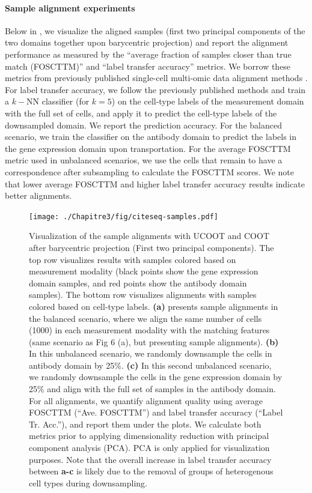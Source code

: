 \paragraph{Sample alignment experiments} Below in ,
we visualize the aligned samples (first two principal components of the two domains
together upon barycentric projection) and report the alignment performance as measured
by the ``average fraction of samples closer than true match (FOSCTTM)'' and
``label transfer accuracy'' metrics. We borrow these metrics from previously published
single-cell multi-omic data alignment methods \citep{Liu2019,cao2020unsupervised,Demetci22,Pamona,Demetci22-2}.
For label transfer accuracy, we follow the previously published methods
\citep{cao2020unsupervised, Pamona, Demetci22, Demetci22-2} and train a $k-$NN classifier
(for $k=5$) on the cell-type labels of the measurement domain with the full set of cells,
and apply it to predict the cell-type labels of the downsampled domain.
We report the prediction accuracy. For the balanced scenario, we train the classifier
on the antibody domain to predict the labels in the gene expression domain upon transportation.
For the average FOSCTTM metric used in unbalanced scenarios, we use the cells that
remain to have a correspondence after subsampling to calculate the FOSCTTM scores.
We note that lower average FOSCTTM and higher label transfer accuracy results indicate
better alignments.

\begin{figure}[h]
    \centering
    \texttt{[image: ./Chapitre3/fig/citeseq-samples.pdf]}
    \caption{Visualization of the sample alignments with UCOOT and COOT after
    barycentric projection (First two principal components). The top row visualizes results
    with samples colored based on measurement modality (black points show the
    gene expression domain samples, and red points show the antibody domain samples).
    The bottom row visualizes alignments with samples colored based on cell-type labels.
    \textbf{(a)} presents sample alignments in the balanced scenario, where we align
    the same number of cells (1000) in each measurement modality with the matching features
    (same scenario as Fig 6 (a), but presenting sample alignments).
    \textbf{(b)} In this unbalanced scenario, we randomly downsample
    the cells in antibody domain by 25\%.
    \textbf{(c)} In this second unbalanced scenario, we randomly downsample the cells
    in the gene expression domain by 25\% and align with the full set of samples
    in the antibody domain. For all alignments, we quantify alignment quality using
    average FOSCTTM (``Ave. FOSCTTM'') and label transfer accuracy (``Label Tr. Acc.''),
    and report them under the plots. We calculate both metrics prior to applying
    dimensionality reduction with principal component analysis (PCA).
    PCA is only applied for visualization purposes. Note that the overall increase in
    label transfer accuracy between \textbf{a-c} is likely due to the removal of
    groups of heterogenous cell types during downsampling.
    \label{fig:multiomicsSamples}
  }
\end{figure}

